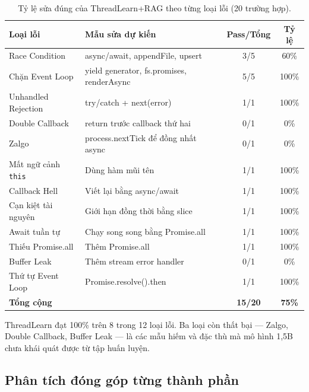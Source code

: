 \documentclass[12pt]{article}
\begin{document}
\begin{table}[ht]
  \centering
  \caption{Tỷ lệ sửa đúng của ThreadLearn+RAG theo từng loại lỗi (20 trường hợp).}
  \label{tab:theolai}
  \begin{tabular}{@{}llcc@{}}
    \toprule
    \textbf{Loại lỗi} & \textbf{Mẫu sửa dự kiến} & \textbf{Pass/Tổng} & \textbf{Tỷ lệ} \\
    \midrule
    Race Condition          & async/await, appendFile, upsert         & 3/5  & 60\% \\
    Chặn Event Loop         & yield generator, fs.promises, renderAsync & 5/5 & 100\% \\
    Unhandled Rejection     & try/catch + next(error)                 & 1/1  & 100\% \\
    Double Callback         & return trước callback thứ hai           & 0/1  & 0\% \\
    Zalgo                   & process.nextTick để đồng nhất async     & 0/1  & 0\% \\
    Mất ngữ cảnh \texttt{this} & Dùng hàm mũi tên                    & 1/1  & 100\% \\
    Callback Hell           & Viết lại bằng async/await               & 1/1  & 100\% \\
    Cạn kiệt tài nguyên     & Giới hạn đồng thời bằng slice          & 1/1  & 100\% \\
    Await tuần tự           & Chạy song song bằng Promise.all         & 1/1  & 100\% \\
    Thiếu Promise.all       & Thêm Promise.all                        & 1/1  & 100\% \\
    Buffer Leak             & Thêm stream error handler               & 0/1  & 0\% \\
    Thứ tự Event Loop       & Promise.resolve().then                  & 1/1  & 100\% \\
    \midrule
    \textbf{Tổng cộng}      &                                         & \textbf{15/20} & \textbf{75\%} \\
    \bottomrule
  \end{tabular}
\end{table}

ThreadLearn đạt 100\% trên 8 trong 12 loại lỗi.
Ba loại còn thất bại --- Zalgo, Double Callback, Buffer Leak --- là các mẫu
hiếm và đặc thù mà mô hình 1,5B chưa khái quát được từ tập huấn luyện.

\subsection{Phân tích đóng góp từng thành phần}
\end{document}
